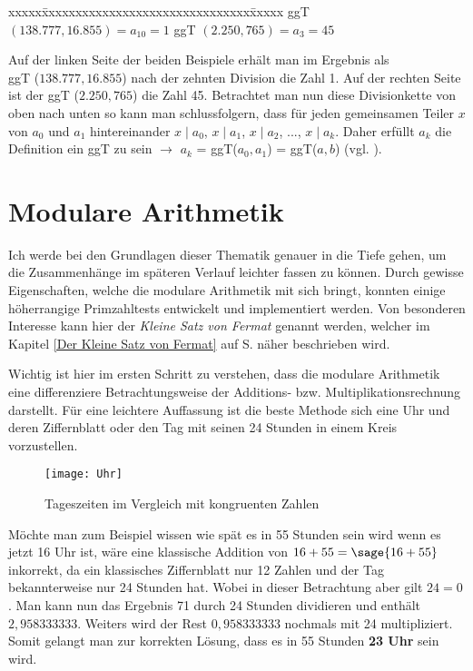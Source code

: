 \documentclass[german,12pt,a4paper]{article}
\begin{document}
\begin{tabbing}
xxxxx\=xxxxxxxxxxxxxxxxxxxxxxxxxxxxxxx\=xxxxx\kill
\> ggT $(138.777, 16.855) = a_{10} = 1$ \> ggT $(2.250, 765) = a_3 = 45$
\end{tabbing}

Auf der linken Seite der beiden Beispiele erhält man im Ergebnis als\\
ggT ($138.777, 16.855$) nach der zehnten Division die Zahl 1. Auf der rechten Seite ist der ggT ($2.250, 765$) die Zahl 45.
Betrachtet man nun diese Divisionkette von oben nach unten so kann man schlussfolgern, dass für jeden gemeinsamen Teiler $x$ von $a_0$ und $a_1$ hintereinander $x \mid a_0$, $x \mid a_1$, $x \mid a_2$, ..., $x \mid a_k$.\newline
Daher erfüllt $a_k$ die Definition ein ggT zu sein $\to$ $a_k$ = ggT($a_0,a_1$) = ggT($a, b$) (vgl. \cite[58--59]{Remmert1995}).

\section{Modulare Arithmetik}
Ich werde bei den Grundlagen dieser Thematik genauer in die Tiefe gehen, um die Zusammenhänge im späteren Verlauf leichter fassen zu können. Durch gewisse Eigenschaften, welche die modulare Arithmetik mit sich bringt, konnten einige höherrangige Primzahltests entwickelt und implementiert werden. Von besonderen Interesse kann hier der \textit{Kleine Satz von Fermat} genannt werden, welcher im Kapitel \ref{Der Kleine Satz von Fermat} auf S. \pageref{Der Kleine Satz von Fermat} näher beschrieben wird.

Wichtig ist hier im ersten Schritt zu verstehen, dass die modulare Arithmetik eine differenziere Betrachtungsweise der Additions- bzw. Multiplikationsrechnung darstellt. Für eine leichtere Auffassung ist die beste Methode sich eine Uhr und deren Ziffernblatt oder den Tag mit seinen 24 Stunden in einem Kreis vorzustellen.

\begin{figure}[h]
 \centering
 \texttt{[image: Uhr]}
 \caption{Tageszeiten im Vergleich mit kongruenten Zahlen}
 \label{fig:Tageszeiten im Vergleich mit kongruenten Zahlen}
 \cite[298]{Meinel2011}
\end{figure}

Möchte man zum Beispiel wissen wie spät es in 55 Stunden sein wird wenn es jetzt 16 Uhr ist, wäre eine klassische Addition von $16+55=\sage{16+55}$ inkorrekt, da ein klassisches Ziffernblatt nur 12 Zahlen und der Tag bekannterweise nur 24 Stunden hat. Wobei in dieser Betrachtung aber gilt $24=0$. Man kann nun das Ergebnis 71 durch 24 Stunden dividieren und enthält $2,958333333$. Weiters wird der Rest $0,958333333$ nochmals mit 24 multipliziert. Somit gelangt man zur korrekten Lösung, dass es in 55 Stunden \textbf{23 Uhr} sein wird.
\end{document}
